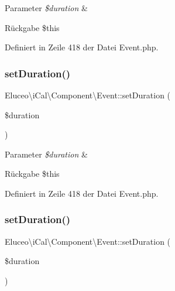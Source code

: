 \begin{DoxyParams}{Parameter}
{\em \$duration} & \\
\hline
\end{DoxyParams}
\begin{DoxyReturn}{Rückgabe}
\$this 
\end{DoxyReturn}


Definiert in Zeile 418 der Datei Event.\+php.

\mbox{\label{class_eluceo_1_1i_cal_1_1_component_1_1_event_aaa4ee424e98d66778e0af4c7c0e4994f}} 
\subsubsection{\texorpdfstring{set\+Duration()}{setDuration()}\hspace{0.1cm}{\footnotesize\ttfamily [2/3]}}
{\footnotesize\ttfamily Eluceo\textbackslash{}i\+Cal\textbackslash{}\+Component\textbackslash{}\+Event\+::set\+Duration (\begin{DoxyParamCaption}\item[{}]{\$duration }\end{DoxyParamCaption})}


\begin{DoxyParams}{Parameter}
{\em \$duration} & \\
\hline
\end{DoxyParams}
\begin{DoxyReturn}{Rückgabe}
\$this 
\end{DoxyReturn}


Definiert in Zeile 418 der Datei Event.\+php.

\mbox{\label{class_eluceo_1_1i_cal_1_1_component_1_1_event_aaa4ee424e98d66778e0af4c7c0e4994f}} 
\subsubsection{\texorpdfstring{set\+Duration()}{setDuration()}\hspace{0.1cm}{\footnotesize\ttfamily [3/3]}}
{\footnotesize\ttfamily Eluceo\textbackslash{}i\+Cal\textbackslash{}\+Component\textbackslash{}\+Event\+::set\+Duration (\begin{DoxyParamCaption}\item[{}]{\$duration }\end{DoxyParamCaption})}


